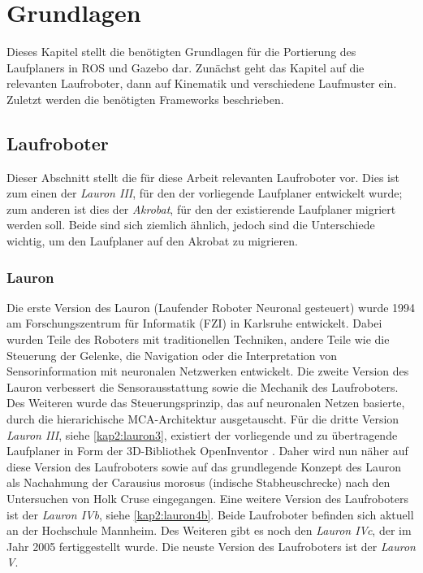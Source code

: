 \chapter{Grundlagen}
\label{kap2}

Dieses Kapitel stellt die benötigten Grundlagen für die Portierung des Laufplaners in  \ac{ROS} und Gazebo dar. Zunächst geht das Kapitel auf die relevanten Laufroboter, dann auf Kinematik und verschiedene Laufmuster ein. Zuletzt werden die benötigten Frameworks beschrieben.

\section{Laufroboter}

Dieser Abschnitt stellt die für diese Arbeit relevanten Laufroboter vor. Dies ist zum einen der \emph{Lauron III}, für den der vorliegende Laufplaner entwickelt wurde; zum anderen ist dies der \emph{Akrobat}, für den der existierende Laufplaner migriert werden soll. Beide sind sich ziemlich ähnlich, jedoch sind die Unterschiede wichtig, um den Laufplaner auf den Akrobat zu migrieren. 

\subsection{Lauron}

Die erste Version des Lauron (Laufender Roboter Neuronal gesteuert) wurde 1994 am Forschungszentrum für Informatik (FZI) in Karlsruhe \autocite{fzi} entwickelt. Dabei wurden Teile des Roboters mit traditionellen Techniken, andere Teile wie die Steuerung der Gelenke, die Navigation oder die Interpretation von Sensorinformation mit neuronalen Netzwerken entwickelt. \autocite{berns1994adaptive} Die zweite Version des Lauron verbessert die Sensorausstattung sowie die Mechanik des Laufroboters. Des Weiteren wurde das Steuerungsprinzip, das auf neuronalen Netzen basierte, durch die hierarichische MCA-Architektur \autocite{scholl2001modular} ausgetauscht. Für die dritte Version \emph{Lauron III}, siehe \autoref{kap2:lauron3}, existiert der vorliegende und zu übertragende Laufplaner in Form der 3D-Bibliothek OpenInventor \autocite{inventor}. Daher wird nun näher auf diese Version des Laufroboters sowie auf das grundlegende Konzept des Lauron als Nachahmung der Carausius morosus (indische Stabheuschrecke) nach den Untersuchen von Holk Cruse eingegangen. \autocite{cruse1976function} Eine weitere Version des Laufroboters ist der \emph{Lauron IVb}, siehe \autoref{kap2:lauron4b}. Beide Laufroboter befinden sich aktuell an der Hochschule Mannheim. Des Weiteren gibt es noch den \emph{Lauron IVc}, der im Jahr 2005 fertiggestellt wurde. \autocite{ziegenmeyer2009sechsbeinige} Die neuste Version des Laufroboters ist der \emph{Lauron V}.

